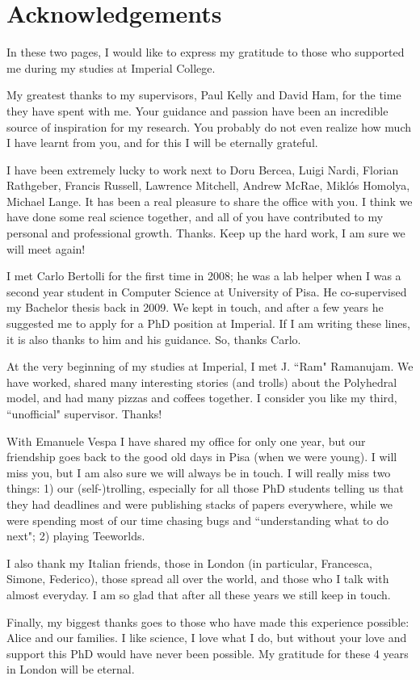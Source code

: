 \chapter*{Acknowledgements}\thispagestyle{plain}
In these two pages, I would like to express my gratitude to those who supported me during my studies at Imperial College. 

My greatest thanks to my supervisors, Paul Kelly and David Ham, for the time they have spent with me. Your guidance and passion have been an incredible source of inspiration for my research. You probably do not even realize how much I have learnt from you, and for this I will be eternally grateful.

I have been extremely lucky to work next to Doru Bercea, Luigi Nardi, Florian Rathgeber, Francis Russell, Lawrence Mitchell, Andrew McRae, Miklós Homolya, Michael Lange. It has been a real pleasure to share the office with you. I think we have done some real science together, and all of you have contributed to my personal and professional growth. Thanks. Keep up the hard work, I am sure we will meet again!

I met Carlo Bertolli for the first time in 2008; he was a lab helper when I was a second year student in Computer Science at University of Pisa. He co-supervised my Bachelor thesis back in 2009. We kept in touch, and after a few years he suggested me to apply for a PhD position at Imperial. If I am writing these lines, it is also thanks to him and his guidance. So, thanks Carlo. 

At the very beginning of my studies at Imperial, I met J. ``Ram" Ramanujam. We have worked, shared many interesting stories (and trolls) about the Polyhedral model, and had many pizzas and coffees together. I consider you like my third, ``unofficial" supervisor. Thanks!

With Emanuele Vespa I have shared my office for only one year, but our friendship goes back to the good old days in Pisa (when we were young). I will miss you, but I am also sure we will always be in touch. I will really miss two things: 1) our (self-)trolling, especially for all those PhD students telling us that they had deadlines and were publishing stacks of papers everywhere, while we were spending most of our time chasing bugs and ``understanding what to do next"; 2) playing Teeworlds. 

I also thank my Italian friends, those in London (in particular, Francesca, Simone, Federico), those spread all over the world, and those who I talk with almost everyday. I am so glad that after all these years we still keep in touch. 

Finally, my biggest thanks goes to those who have made this experience possible: Alice and our families. I like science, I love what I do, but without your love and support this PhD would have never been possible. My gratitude for these 4 years in London will be eternal.

